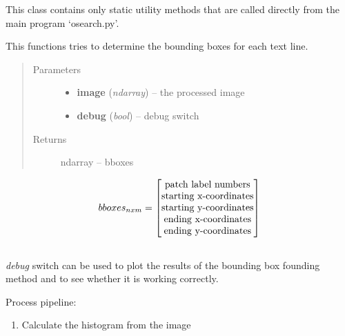 \documentclass[letterpaper,10pt,english]{sphinxmanual}
\begin{document}
\begin{fulllineitems}
\label{code:OratUtils.OratUtils}
This class contains only static utility methods that are called directly from the main program `osearch.py'.

\begin{fulllineitems}
\label{code:OratUtils.OratUtils.boundingBox}
This functions tries to determine the bounding boxes for each text line.
\begin{quote}\begin{description}
\item[{Parameters}] \leavevmode\begin{itemize}
\item {} 
\textbf{image} (\emph{ndarray}) -- the processed image

\item {} 
\textbf{debug} (\emph{bool}) -- debug switch

\end{itemize}

\item[{Returns}] \leavevmode
ndarray -- bboxes

\end{description}\end{quote}
\begin{gather}
\begin{split}bboxes_{nxm} = 
\begin{bmatrix}
        \text{patch label numbers}\\
        \text{starting x-coordinates}\\
        \text{starting y-coordinates}\\
        \text{ending x-coordinates}\\
        \text{ending y-coordinates}
\end{bmatrix}\end{split}\notag\\\begin{split}\end{split}\notag
\end{gather}
\emph{debug} switch can be used to plot the results of the bounding box 
founding method and to see whether it is working correctly.

Process pipeline:
\begin{enumerate}
\item {} 
Calculate the histogram from the image


\end{enumerate}
\end{fulllineitems}
\end{fulllineitems}
\end{document}

